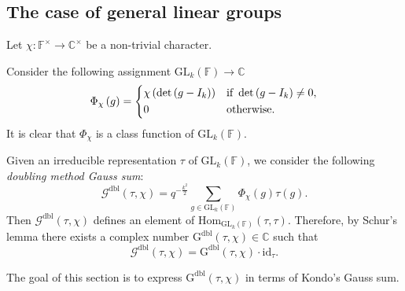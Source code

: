 \documentclass[12pt, reqno]{amsart}
\theoremstyle{definition}
\theoremstyle{definition}
\theoremstyle{definition}
\newcommand{\cComplex}{\mathbb{C}}
\newcommand{\multiplicativegroup}[1]{#1^{\times}}
\newcommand{\Hom}{\mathrm{Hom}}
\newcommand{\idmap}{\mathrm{id}}
\newcommand{\IdentityMatrix}[1]{I_{#1}}
\newcommand{\GL}{\mathrm{GL}}
\newcommand{\finiteField}{\mathbb{F}}
\newcommand{\dblGaussSum}[2]{\mathcal{G}^{\mathrm{dbl}}\left(#1, #2\right)}
\newcommand{\dblGaussSumScalar}[2]{\mathrm{G}^{\mathrm{dbl}}\left(#1, #2\right)}
\begin{document}
\subsection{The case of general linear groups}

Let $\chi \colon \multiplicativegroup{\finiteField} \to \multiplicativegroup{\cComplex}$ be a non-trivial character.

Consider the following assignment $\GL_k\left(\finiteField\right) \to \cComplex$
$$\Phi_{\chi}\left(g\right) = \begin{dcases}
	\chi\left(\det\left(g-\IdentityMatrix{k}\right)\right) & \text{if }\det\left(g-\IdentityMatrix{k}\right) \ne 0,\\
	0 & \text{otherwise.}
\end{dcases}$$
It is clear that $\Phi_{\chi}$ is a class function of $\GL_k\left(\finiteField\right)$.

Given an irreducible representation $\tau$ of $\GL_k\left(\finiteField\right)$, we consider the following \emph{doubling method Gauss sum}:
$$\dblGaussSum{\tau}{\chi} = q^{-\frac{k^2}{2}} \sum_{g \in \GL_k\left(\finiteField\right)} \Phi_{\chi}\left(g\right) \tau\left(g\right).$$
Then $\dblGaussSum{\tau}{\chi}$ defines an element of $\Hom_{\GL_k\left(\finiteField\right)}\left(\tau, \tau\right)$. Therefore, by Schur's lemma there exists a complex number $\dblGaussSumScalar{\tau}{\chi} \in \cComplex$ such that $$\dblGaussSum{\tau}{\chi} = \dblGaussSumScalar{\tau}{\chi} \cdot \idmap_\tau.$$ 

The goal of this section is to express $\dblGaussSumScalar{\tau}{\chi}$ in terms of Kondo's Gauss sum.
\end{document}
